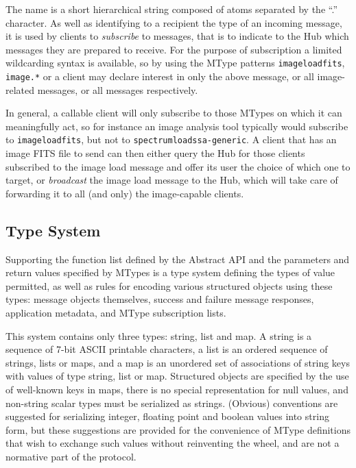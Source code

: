 \documentclass[5p]{elsarticle}
\begin{document}
The name is a short hierarchical string composed of atoms separated
by the ``.'' character.
As well as identifying to a recipient the type of an incoming message,
it is used by clients to {\em subscribe\/} to messages, that is to
indicate to the Hub which messages they are prepared to receive.
For the purpose of subscription a limited wildcarding syntax is available,
so by using the MType patterns
{\tt image{\kdot}load{\kdot}fits}, {\tt image.*} or {\tt *}
a client may declare interest in only the above message,
or all image-related messages, or all messages respectively.

In general, a callable client will only subscribe to those MTypes on which
it can meaningfully act, so for instance an image analysis tool
typically would subscribe to {\tt image{\kdot}load{\kdot}fits},
but not to {\tt spectrum{\kdot}load{\kdot}ssa-generic}.
A client that has an image FITS file to send can then
either query the Hub for those clients subscribed to the image load
message and offer its user the choice of which one to target,
or {\em broadcast} the image load message to the Hub, which will
take care of forwarding it to all (and only) the image-capable clients.

\subsection{Type System} \label{sec:typeSystem}

Supporting the function list defined by the Abstract API
and the parameters and return values specified by MTypes
is a type system defining the types of value permitted,
as well as rules for encoding various structured objects
using these types: message objects themselves, success and failure
message responses, application metadata, and MType subscription lists.

This system contains only three types:
string, list and map.
A string is a sequence of 7-bit ASCII printable characters,
a list is an ordered sequence of strings, lists or maps, and
a map is an unordered set of associations of string keys with values
of type string, list or map.
Structured objects are specified by the use of well-known keys in maps,
there is no special representation for null values,
and non-string scalar types must be serialized as strings.
(Obvious) conventions are suggested for serializing
integer, floating point and boolean values into string form,
but these suggestions are provided for the convenience
of MType definitions that wish to exchange such values without
reinventing the wheel, and are not a normative part of the protocol.
\end{document}
